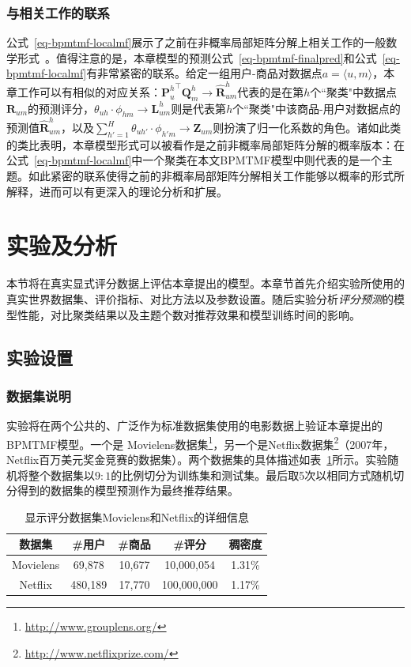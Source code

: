 \subsubsection{与相关工作的联系} 
公式~\ref{eq-bpmtmf-localmf}展示了之前在非概率局部矩阵分解上相关工作的一般数学形式~\cite{MJT11,lee2013local,chen2015wemarec}。值得注意的是，本章模型的预测公式~\ref{eq-bpmtmf-finalpred}和公式~\ref{eq-bpmtmf-localmf}有非常紧密的联系。给定一组用户-商品对数据点$a=\langle u,m\rangle$，本章工作可以有相似的对应关系：${\mathbf{P}_u^{h}}^{\top}\mathbf{Q}_m^{h}\rightarrow \hat{\mathbf{R}}_{um}^{h}$代表的是在第$h$个``聚类"中数据点$\mathbf{R}_{um}$的预测评分，$\theta_{uh}\cdot\phi_{hm}\rightarrow \mathbf{L}_{um}^{h}$则是代表第$h$个``聚类"中该商品-用户对数据点的预测值$\hat{\mathbf{R}}_{um}^{h}$，以及$\sum_{h'=1}^{H}\theta_{uh'}\cdot \phi_{h'm}\rightarrow \mathbf{Z}_{um}$则扮演了归一化系数的角色。诸如此类的类比表明，本章模型形式可以被看作是之前非概率局部矩阵分解的概率版本：在公式~\ref{eq-bpmtmf-localmf}中一个聚类在本文BPMTMF模型中则代表的是一个主题。如此紧密的联系使得之前的非概率局部矩阵分解相关工作能够以概率的形式所解释，进而可以有更深入的理论分析和扩展。

\section{实验及分析}
\label{sec-bpmtmf-experiments}
本节将在真实显式评分数据上评估本章提出的模型。本章节首先介绍实验所使用的真实世界数据集、评价指标、对比方法以及参数设置。随后实验分析\textit{评分预测}的模型性能，对比聚类结果以及主题个数对推荐效果和模型训练时间的影响。
\subsection{实验设置}
\subsubsection{数据集说明}
实验将在两个公共的、广泛作为标准数据集使用的电影数据上验证本章提出的BPMTMF模型。一个是 Movielens数据集\footnote{\url{http://www.grouplens.org/}}，另一个是Netflix数据集\footnote{\url{http://www.netflixprize.com/}}（2007年，Netflix百万美元奖金竞赛的数据集）。两个数据集的具体描述如表~\ref{tab-bpmtmf-data}所示。实验随机将整个数据集以$9:1$的比例切分为训练集和测试集。最后取5次以相同方式随机切分得到的数据集的模型预测作为最终推荐结果。

\begin{table}
	\centering
	\caption{显示评分数据集Movielens和Netflix的详细信息}
	\label{tab-bpmtmf-data}%

		\begin{tabular}{c||cccc}
			\hline
			数据集 & \#用户 & \#商品 & \#评分 & 稠密度 \bigstrut\\
			\hline
			\hline
			Movielens &  69,878 &  10,677 & 10,000,054 & 1.31\% \bigstrut\\
			Netflix & 480,189 & 17,770 & 100,000,000 & 1.17\% \bigstrut\\
			\hline
		\end{tabular}%

\end{table}%

